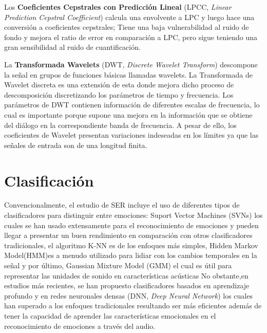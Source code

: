 \documentclass[11pt,a4paper,spanish]{book}
\begin{document}
	 Los \textbf{Coeficientes Cepstrales con Predicción Lineal} (LPCC, \emph{Linear Prediction Cepstral Coefficient}) calcula una envolvente a LPC y luego hace una conversión a coeficientes cepstrales; Tiene una baja vulnerabilidad al ruido de fondo y mejora el ratio de error en comparación a LPC, pero sigue teniendo una gran sensibilidad al ruido de cuantificación.\hfill \break
	
	La \textbf{Transformada Wavelets} (DWT, \emph{Discrete Wavelet Transform}) descompone la señal en grupos de funciones básicas llamadas wavelets. La Transformada de Wavelet discreta es una extensión de esta donde mejora dicho proceso de descomposición discretizando los parámetros de tiempo y frecuencia. Los parámetros de DWT contienen información de diferentes escalas de frecuencia, lo cual es importante porque supone una mejora en la información que se obtiene del diálogo en la correspondiente banda de frecuencia. A pesar de ello, los coeficientes de Wavelet presentan variaciones indeseadas en los límites ya que las señales de entrada son de una longitud finita.\hfill \break

	
	
	\section{Clasificación}
	Convencionalmente, el estudio de SER incluye el uso de diferentes tipos de clasificadores para distinguir entre emociones: Suport Vector Machines (SVNs) los cuales se han usado extensamente para el reconocimiento de emociones y pueden llegar a presentar un buen rendimiento en comparación con otros clasificadores tradicionales, el algoritmo K-NN es de los enfoques más simples, Hidden Markov Model(HMM)es a menudo utilizado para lidiar con los cambios temporales en la señal y por último, Gaussian Mixture Model (GMM) el cual es útil para representar las unidades de sonido en características acústicas %
	No obstante,en estudios más recientes, se han propuesto clasificadores basados en aprendizaje profundo y en redes neuronales densas (DNN, \emph{Deep Neural Network}) los cuales han superado a los enfoques tradicionales resultando ser más eficientes además de tener la capacidad de aprender las características emocionales en el reconocimiento de emociones a través del audio.
	
\end{document}
